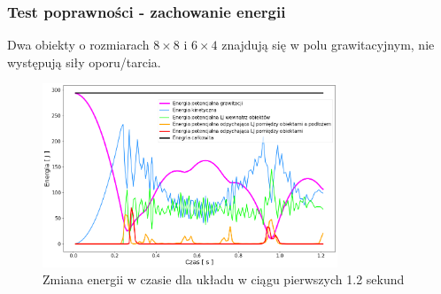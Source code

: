 \documentclass{beamer}
\begin{document}
\begin{frame}
    \frametitle{Test poprawności - zachowanie energii}

    Dwa obiekty o rozmiarach $8 \times 8$ i $6 \times 4$ znajdują się w polu grawitacyjnym, 
    nie występują siły oporu/tarcia.

    \begin{figure}[H]
        \centering
        \includegraphics[width=8.8cm]{energy_test_0to2s.png}
        \caption{Zmiana energii w czasie dla układu w ciągu pierwszych 1.2 sekund}
    \end{figure}

\end{frame}
\end{document}
